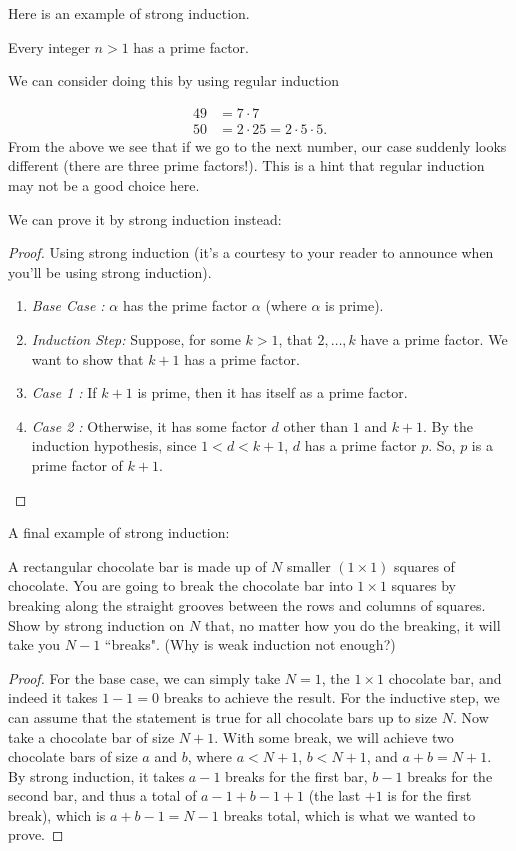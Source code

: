 Here is an example of strong induction.
\begin{theorem}
Every integer $n > 1$ has a prime factor.
\end{theorem}
We can consider doing this by using regular induction
\begin{example}
\begin{align*}
    49 &= 7 \cdot 7 \\
    50 &= 2 \cdot 25 = 2 \cdot 5 \cdot 5.
\end{align*}
From the above we see that if we go to the next number, our case suddenly looks different (there are three prime factors!). This is a hint that regular induction may not be a good choice here. 
\end{example}
We can prove it by strong induction instead:
\begin{proof}
Using strong induction (it's a courtesy to your reader to announce when you'll be using strong induction).
\begin{enumerate}
    \item \emph{Base Case : } $\alpha$ has the prime factor $\alpha$ (where $\alpha$ is prime). 
    \item \emph{Induction Step: } Suppose, for some $k>1$, that $2, \dots, k$ have a prime factor. We want to show that $k+1$ has a prime factor.
    \item \emph{Case 1 : } If $k+1$ is prime, then it has itself as a prime factor. 
    \item \emph{Case 2 : } Otherwise, it has some factor $d$ other than $1$ and $k+1$. By the induction hypothesis, since $1 < d < k+1$, $d$ has a prime factor $p$. So, $p$ is a prime factor of $k + 1$.
\end{enumerate}
\end{proof}

A final example of strong induction:
\begin{example}
A rectangular chocolate bar is made up of $N$ smaller $(1\times 1)$ squares of chocolate. You are going to break the chocolate bar into $1\times1$ squares by breaking along the straight grooves between the rows and columns of squares. Show by strong induction on $N$ that, no matter how you do the breaking, it will take you $N-1$    ``breaks". (Why is weak induction not enough?)
\end{example}

\begin{proof}
For the base case, we can simply take $N=1$, the $1\times1$ chocolate bar, and indeed it takes $1-1 = 0$ breaks to achieve the result. For the inductive step, we can assume that the statement is true for all chocolate bars up to size $N$. Now take a chocolate bar of size $N+1$. With some break, we will achieve two chocolate bars of size $a$ and $b$, where $a < N+1$, $b < N+1$, and $a+b = N+1$. By strong induction, it takes $a-1$ breaks for the first bar, $b-1$ breaks for the second bar, and thus a total of $a-1 + b-1 + 1$ (the last $+1$ is for the first break), which is $a+b-1 = N-1$ breaks total, which is what we wanted to prove.
\end{proof}